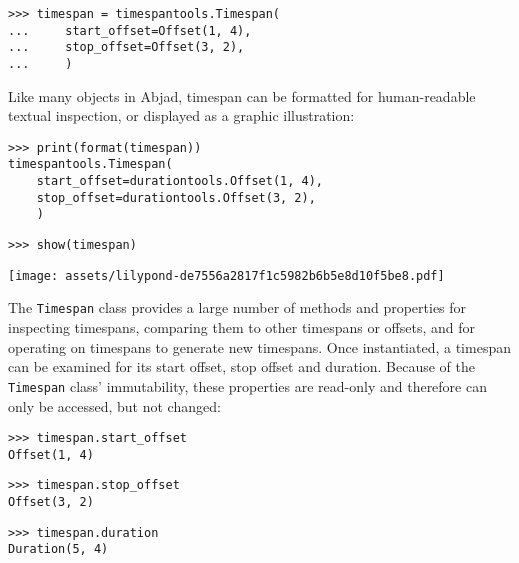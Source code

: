 \begin{abjadbookoutput}
\begin{singlespacing}
\vspace{-0.5\baselineskip}
\begin{lstlisting}
>>> timespan = timespantools.Timespan(
...     start_offset=Offset(1, 4),
...     stop_offset=Offset(3, 2),
...     )
\end{lstlisting}
\end{singlespacing}
\end{abjadbookoutput}

\noindent Like many objects in Abjad, timespan can be formatted for
human-readable textual inspection, or displayed as a graphic illustration:

\begin{comment}
<abjad>
print(format(timespan))
show(timespan)
</abjad>
\end{comment}

\begin{abjadbookoutput}
\begin{singlespacing}
\vspace{-0.5\baselineskip}
\begin{lstlisting}
>>> print(format(timespan))
timespantools.Timespan(
    start_offset=durationtools.Offset(1, 4),
    stop_offset=durationtools.Offset(3, 2),
    )
\end{lstlisting}
\begin{lstlisting}
>>> show(timespan)
\end{lstlisting}
\noindent\texttt{[image: assets/lilypond-de7556a2817f1c5982b6b5e8d10f5be8.pdf]}
\end{singlespacing}
\end{abjadbookoutput}

\noindent The \texttt{Timespan} class provides a large number of methods and
properties for inspecting timespans, comparing them to other timespans or
offsets, and for operating on timespans to generate new timespans. Once
instantiated, a timespan can be examined for its start offset, stop offset
and duration. Because of the \texttt{Timespan} class' immutability, these
properties are read-only and therefore can only be accessed, but not changed:

\begin{comment}
<abjad>
timespan.start_offset
timespan.stop_offset
timespan.duration
</abjad>
\end{comment}

\begin{abjadbookoutput}
\begin{singlespacing}
\vspace{-0.5\baselineskip}
\begin{lstlisting}
>>> timespan.start_offset
Offset(1, 4)
\end{lstlisting}
\begin{lstlisting}
>>> timespan.stop_offset
Offset(3, 2)
\end{lstlisting}
\begin{lstlisting}
>>> timespan.duration
Duration(5, 4)
\end{lstlisting}
\end{singlespacing}
\end{abjadbookoutput}

